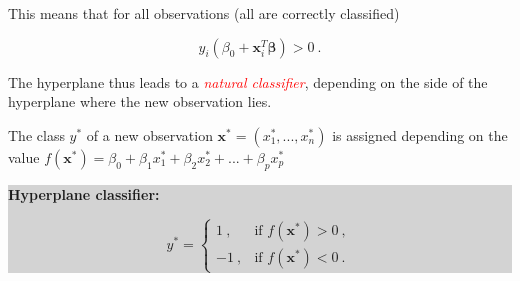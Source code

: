 \documentclass[10pt,ignorenonframetext,]{beamer}
\begin{document}
\begin{frame}

This means that for all observations (all are correctly classified)

\[y_i (\beta_0+{\boldsymbol x}_i^T {\boldsymbol \beta})>0 \ .\]

\vspace{2mm} The hyperplane thus leads to a
\emph{\textcolor{red}{natural classifier}}, depending on the side of the
hyperplane where the new observation lies.

The class \(y^*\) of a new observation
\({\boldsymbol x}^*=(x_1^*,...,x_n^*)\) is assigned depending on the
value
\(f({\boldsymbol x}^*)=\beta_0+\beta_1 x_1^* + \beta_2 x_{2}^*+...+\beta_p x_{p}^*\)

\begin{center}
\colorbox{lightgray}{\begin{minipage}{8cm}
{\bf Hyperplane classifier:}

$$y^* = \left\{ \begin{array}{ll}
1 \ , & \text{if } f({\boldsymbol x}^*) >0 \ ,\\
-1 \ , & \text{if } f({\boldsymbol x}^*) < 0 \ .
\end{array}\right.$$
 \end{minipage}}
\end{center}

\end{frame}
\end{document}
